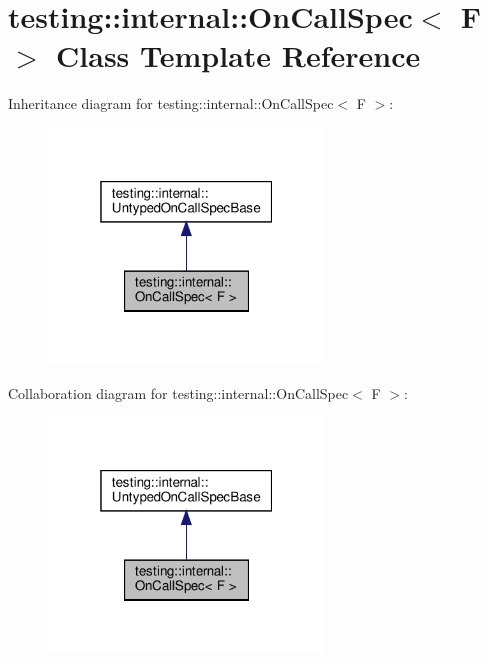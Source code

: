 \hypertarget{classtesting_1_1internal_1_1_on_call_spec}{}\section{testing\+:\+:internal\+:\+:On\+Call\+Spec$<$ F $>$ Class Template Reference}
\label{classtesting_1_1internal_1_1_on_call_spec}


Inheritance diagram for testing\+:\+:internal\+:\+:On\+Call\+Spec$<$ F $>$\+:
\nopagebreak
\begin{figure}[H]
\begin{center}
\leavevmode
\includegraphics[width=208pt]{classtesting_1_1internal_1_1_on_call_spec__inherit__graph}
\end{center}
\end{figure}


Collaboration diagram for testing\+:\+:internal\+:\+:On\+Call\+Spec$<$ F $>$\+:
\nopagebreak
\begin{figure}[H]
\begin{center}
\leavevmode
\includegraphics[width=208pt]{classtesting_1_1internal_1_1_on_call_spec__coll__graph}
\end{center}
\end{figure}
